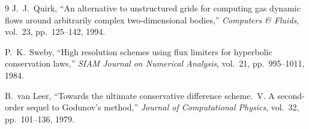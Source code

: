 \documentclass[11pt]{article}
\begin{document}
\begin{thebibliography}{9}
J.~J.~Quirk,
``An alternative to unstructured grids for computing gas dynamic flows around
arbitrarily complex two-dimensional bodies,''
\emph{Computers \& Fluids}, vol.~23, pp.~125--142, 1994.

P.~K.~Sweby,
``High resolution schemes using flux limiters for hyperbolic conservation laws,''
\emph{SIAM Journal on Numerical Analysis}, vol.~21, pp.~995--1011, 1984.

B.~van Leer,
``Towards the ultimate conservative difference scheme.\ V\@.
A second-order sequel to Godunov's method,''
\emph{Journal of Computational Physics}, vol.~32, pp.~101--136, 1979.

\end{thebibliography}

\end{document}
